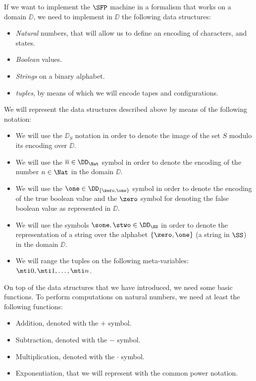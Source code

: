 If we want to implement the $\SFP$ machine in a formalism that works on a domain $\DD$, we need to implement in $\DD$ the following data structures:

\begin{itemize}
\item \emph{Natural} numbers, that will allow us to define an encoding of characters, and states.
\item \emph{Boolean} values.
\item \emph{Strings} on a binary alphabet.
\item \emph{tuples}, by means of which we will encode tapes and configurations.
\end{itemize}

\begin{notation}
We will represent the data structures described above by means of the following notation:
\begin{itemize}
\item We will use the $\DD_S$ notation in order to denote the image of the set $S$ modulo its encoding over $\DD$.
\item We will use the $\overline n \in \DD_\Nat$ symbol in order to denote the encoding of the number $n\in \Nat$ in the domain $\DD$.
\item We will use the $\one\in \DD_{\{\zero, \one\}}$ symbol in order to denote the encoding of the true boolean value and the $\zero$ symbol for denoting the false boolean value as represented in $\DD$.
\item We will use the symbols $\sone, \stwo \in \DD_\SS$ in order to denote the representation of a string over the alphabet $\{\zero, \one\}$ (a string in $\SS$) in the domain $\DD$.
\item We will range the tuples on the following meta-variables: $\mti0, \mti1, \ldots ,\mti n$.
\end{itemize}
\end{notation}


On top of the data structures that we have introduced, we need some basic functions. To perform computations on natural numbers, we need at least the following functions:

\begin{itemize}
\item Addition, denoted with the $+$ symbol.
\item Subtraction, denoted with the $-$ symbol.
\item Multiplication, denoted with the $\cdot$ symbol.
\item Exponentiation, that we will represent with the common power notation.
\end{itemize}

